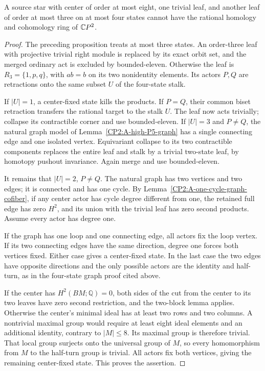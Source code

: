 \begin{proposition}
\label{CP2:A-star-three-leaf-four-states}
A source star with center of order at most eight, one
trivial leaf, and another leaf of order at most three on
at most four states cannot have the rational homology
and cohomology ring of $\mathbb{C}P^2$.
\end{proposition}
\begin{proof}
The preceding proposition treats at most three states.
An order-three leaf with projective trivial right module
is replaced by its exact orbit set, and the merged
ordinary act is excluded by bounded-eleven. Otherwise
the leaf is $R_3=\{1,p,q\}$, with $ab=b$ on its two
nonidentity elements. Its actors $P,Q$ are retractions
onto the same subset $U$ of the four-state stalk.

If $|U|=1$, a center-fixed state kills the products. If
$P=Q$, their common biset retraction transfers the rational
target to the stalk $U$. The leaf now acts trivially;
collapse its contractible corner and use bounded-eleven.
If $|U|=3$ and $P\ne Q$, the natural graph model of
Lemma~\ref{CP2:A-high-P5-graph} has a single connecting
edge and one isolated vertex. Equivariant collapse to
its two contractible components replaces the entire
leaf and stalk by a trivial two-state leaf, by homotopy
pushout invariance. Again merge and use bounded-eleven.

It remains that $|U|=2$, $P\ne Q$. The natural graph
has two vertices and two edges; it is connected and
has one cycle. By Lemma~\ref{CP2:A-one-cycle-graph-cofiber},
if any center actor has cycle degree different from one,
the retained full edge has zero $H^2$, and its union
with the trivial leaf has zero second products.
Assume every actor has degree one.

If the graph has one loop and one connecting edge, all
actors fix the loop vertex. If its two connecting edges
have the same direction, degree one forces both vertices
fixed. Either case gives a center-fixed state. In the
last case the two edges have opposite directions and
the only possible actors are the identity and half-turn,
as in the four-state graph proof cited above.

If the center has $H^2(BM;\mathbb Q)=0$, both sides of
the cut from the center to its two leaves have zero
second restriction, and the two-block lemma applies.
Otherwise the center's minimal ideal has at least two
rows and two columns. A nontrivial maximal group would
require at least eight ideal elements and an additional
identity, contrary to $|M|\leq8$. Its maximal group is
therefore trivial. That local group surjects onto the
universal group of $M$, so every homomorphism from $M$
to the half-turn group is trivial. All actors fix both
vertices, giving the remaining center-fixed state.
This proves the assertion.
\end{proof}

